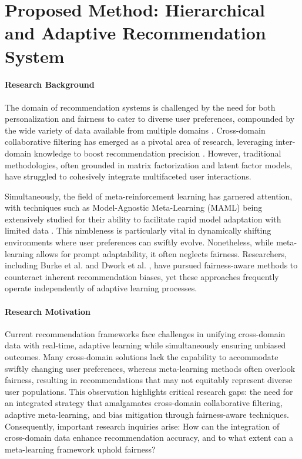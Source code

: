 \section{Proposed Method: Hierarchical and Adaptive Recommendation System}

\paragraph{Research Background}
The domain of recommendation systems is challenged by the need for both personalization and fairness to cater to diverse user preferences, compounded by the wide variety of data available from multiple domains \cite{tang2012cross}. Cross-domain collaborative filtering has emerged as a pivotal area of research, leveraging inter-domain knowledge to boost recommendation precision \cite{fernandez2012cross, sang2015effective}. However, traditional methodologies, often grounded in matrix factorization and latent factor models, have struggled to cohesively integrate multifaceted user interactions.

Simultaneously, the field of meta-reinforcement learning has garnered attention, with techniques such as Model-Agnostic Meta-Learning (MAML) being extensively studied for their ability to facilitate rapid model adaptation with limited data \cite{finn2017model, nichol2018first}. This nimbleness is particularly vital in dynamically shifting environments where user preferences can swiftly evolve. Nonetheless, while meta-learning allows for prompt adaptability, it often neglects fairness. Researchers, including Burke et al. \cite{burke2018balanced} and Dwork et al. \cite{dwork2012fairness}, have pursued fairness-aware methods to counteract inherent recommendation biases, yet these approaches frequently operate independently of adaptive learning processes.

\paragraph{Research Motivation}
Current recommendation frameworks face challenges in unifying cross-domain data with real-time, adaptive learning while simultaneously ensuring unbiased outcomes. Many cross-domain solutions lack the capability to accommodate swiftly changing user preferences, whereas meta-learning methods often overlook fairness, resulting in recommendations that may not equitably represent diverse user populations. This observation highlights critical research gaps: the need for an integrated strategy that amalgamates cross-domain collaborative filtering, adaptive meta-learning, and bias mitigation through fairness-aware techniques. Consequently, important research inquiries arise: How can the integration of cross-domain data enhance recommendation accuracy, and to what extent can a meta-learning framework uphold fairness?

